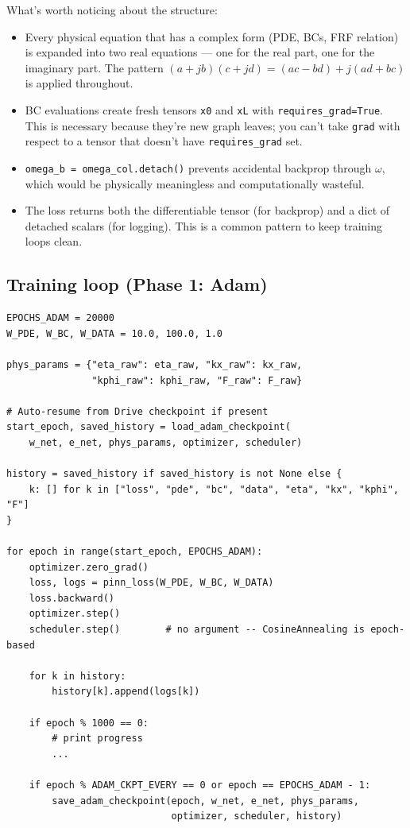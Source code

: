 \documentclass[11pt,a4paper]{article}
\begin{document}
What's worth noticing about the structure:
\begin{itemize}[leftmargin=*, itemsep=2pt]
\item Every physical equation that has a complex form (PDE, BCs, FRF relation) is expanded into two real equations --- one for the real part, one for the imaginary part. The pattern $(a + jb)(c + jd) = (ac - bd) + j(ad + bc)$ is applied throughout.
\item BC evaluations create fresh tensors \texttt{x0} and \texttt{xL} with \texttt{requires\_grad=True}. This is necessary because they're new graph leaves; you can't take \texttt{grad} with respect to a tensor that doesn't have \texttt{requires\_grad} set.
\item \texttt{omega\_b = omega\_col.detach()} prevents accidental backprop through $\omega$, which would be physically meaningless and computationally wasteful.
\item The loss returns both the differentiable tensor (for backprop) and a dict of detached scalars (for logging). This is a common pattern to keep training loops clean.
\end{itemize}

\subsection{Training loop (Phase 1: Adam)}

\begin{lstlisting}[caption={Adam training loop with auto-resume}]
EPOCHS_ADAM = 20000
W_PDE, W_BC, W_DATA = 10.0, 100.0, 1.0

phys_params = {"eta_raw": eta_raw, "kx_raw": kx_raw,
               "kphi_raw": kphi_raw, "F_raw": F_raw}

# Auto-resume from Drive checkpoint if present
start_epoch, saved_history = load_adam_checkpoint(
    w_net, e_net, phys_params, optimizer, scheduler)

history = saved_history if saved_history is not None else {
    k: [] for k in ["loss", "pde", "bc", "data", "eta", "kx", "kphi", "F"]
}

for epoch in range(start_epoch, EPOCHS_ADAM):
    optimizer.zero_grad()
    loss, logs = pinn_loss(W_PDE, W_BC, W_DATA)
    loss.backward()
    optimizer.step()
    scheduler.step()        # no argument -- CosineAnnealing is epoch-based

    for k in history:
        history[k].append(logs[k])

    if epoch % 1000 == 0:
        # print progress
        ...

    if epoch % ADAM_CKPT_EVERY == 0 or epoch == EPOCHS_ADAM - 1:
        save_adam_checkpoint(epoch, w_net, e_net, phys_params,
                             optimizer, scheduler, history)
\end{lstlisting}
\end{document}
